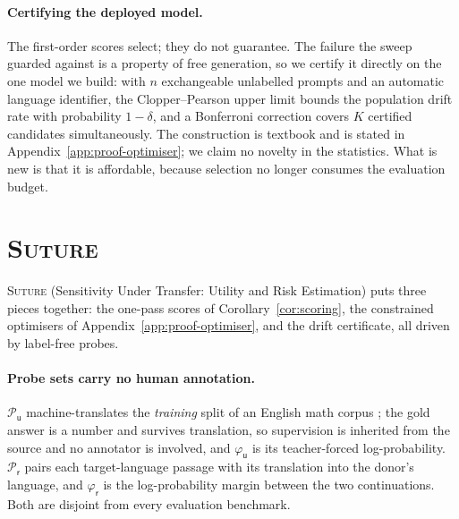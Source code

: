 \documentclass[10pt]{article}
\theoremstyle{plain}
\theoremstyle{definition}
\theoremstyle{remark}
\newcommand{\util}{\mathsf{u}}
\newcommand{\risk}{\mathsf{r}}
\begin{document}
\paragraph{Certifying the deployed model.}
The first-order scores select; they do not guarantee. The failure the sweep
guarded against is a property of free generation, so we certify it directly on
the one model we build: with $n$ exchangeable unlabelled prompts and an automatic
language identifier, the Clopper--Pearson upper limit \citep{clopper1934} bounds
the population drift rate with probability $1-\delta$, and a Bonferroni
correction covers $K$ certified candidates simultaneously. The construction is
textbook \citep{vovk2005, angelopoulos2023gentle} and is stated in
Appendix~\ref{app:proof-optimiser}; we claim no novelty in the statistics. What
is new is that it is affordable, because selection no longer consumes the
evaluation budget.

\section{\textsc{Suture}}
\label{sec:method}

\textsc{Suture} (Sensitivity Under Transfer: Utility and Risk Estimation) puts
three pieces together: the one-pass scores of Corollary~\ref{cor:scoring}, the
constrained optimisers of Appendix~\ref{app:proof-optimiser}, and the drift
certificate, all driven by label-free probes.

\paragraph{Probe sets carry no human annotation.}
$\mathcal{P}_\util$ machine-translates the \emph{training} split of an English math
corpus \citep{cobbe2021gsm8k}; the gold answer is a number and survives
translation, so supervision is inherited from the source and no annotator is
involved, and $\varphi_\util$ is its teacher-forced log-probability.
$\mathcal{P}_\risk$ pairs each target-language passage with its translation into
the donor's language, and $\varphi_\risk$ is the log-probability margin between
the two continuations. Both are disjoint from every evaluation benchmark.
\end{document}

